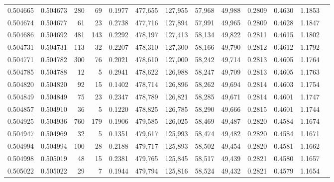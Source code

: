 \begin{tabular}{rrrrrrrrrrrrr}
0.504665 & 0.504673 &   280 &    69 &                                     0.1977 & 477,655 & 127,955 &  57,968 &  49,988 & 0.2809 & 0.4630 & 1.1853 \\
0.504674 & 0.504677 &    61 &    23 &                                     0.2738 & 477,716 & 127,894 &  57,991 &  49,965 & 0.2809 & 0.4628 & 1.1847 \\
0.504686 & 0.504692 &   481 &   143 &                                     0.2292 & 478,197 & 127,413 &  58,134 &  49,822 & 0.2811 & 0.4615 & 1.1802 \\
0.504731 & 0.504731 &   113 &    32 &                                     0.2207 & 478,310 & 127,300 &  58,166 &  49,790 & 0.2812 & 0.4612 & 1.1792 \\
0.504771 & 0.504782 &   300 &    76 &                                     0.2021 & 478,610 & 127,000 &  58,242 &  49,714 & 0.2813 & 0.4605 & 1.1764 \\
0.504785 & 0.504788 &    12 &     5 &                                     0.2941 & 478,622 & 126,988 &  58,247 &  49,709 & 0.2813 & 0.4605 & 1.1763 \\
0.504820 & 0.504820 &    92 &    15 &                                     0.1402 & 478,714 & 126,896 &  58,262 &  49,694 & 0.2814 & 0.4603 & 1.1754 \\
0.504849 & 0.504849 &    75 &    23 &                                     0.2347 & 478,789 & 126,821 &  58,285 &  49,671 & 0.2814 & 0.4601 & 1.1747 \\
0.504857 & 0.504910 &    36 &     5 &                                     0.1220 & 478,825 & 126,785 &  58,290 &  49,666 & 0.2815 & 0.4601 & 1.1744 \\
0.504925 & 0.504936 &   760 &   179 &                                     0.1906 & 479,585 & 126,025 &  58,469 &  49,487 & 0.2820 & 0.4584 & 1.1674 \\
0.504947 & 0.504969 &    32 &     5 &                                     0.1351 & 479,617 & 125,993 &  58,474 &  49,482 & 0.2820 & 0.4584 & 1.1671 \\
0.504994 & 0.504994 &   100 &    28 &                                     0.2188 & 479,717 & 125,893 &  58,502 &  49,454 & 0.2820 & 0.4581 & 1.1662 \\
0.504998 & 0.505019 &    48 &    15 &                                     0.2381 & 479,765 & 125,845 &  58,517 &  49,439 & 0.2821 & 0.4580 & 1.1657 \\
0.505022 & 0.505022 &    29 &     7 &                                     0.1944 & 479,794 & 125,816 &  58,524 &  49,432 & 0.2821 & 0.4579 & 1.1654 \\

\end{tabular}

